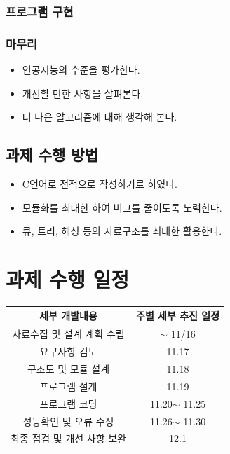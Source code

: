 \documentclass[12pt,a4paper]{report}
\begin{document}
\subsection{프로그램 구현}



\subsection{마무리}
\begin{itemize}
\item 인공지능의 수준을 평가한다.
\item 개선할 만한 사항을 살펴본다.
\item 더 나은 알고리즘에 대해 생각해 본다.
\end{itemize}
\section{과제 수행 방법}
\begin{itemize}
\item C언어로 전적으로 작성하기로 하였다. 
\item 모듈화를 최대한 하여 버그를 줄이도록 노력한다.
\item 큐, 트리, 해싱 등의 자료구조를 최대한 활용한다.
\end{itemize}
\chapter{과제 수행 일정}
\begin{tabular}{|c|c|}
	\hline
세부 개발내용&주별 세부 추진 일정\\
\hline
자료수집 및 설계 계획 수립&$\sim$ 11/16\\
요구사항 검토&11.17\\
구조도 및 모듈 설계&11.18\\
프로그램 설계&11.19\\
프로그램 코딩&11.20$\sim$ 11.25\\
성능확인 및 오류 수정&11.26$\sim$ 11.30\\
최종 점검 및 개선 사항 보완&12.1\\
\hline
\end{tabular}
\end{document}
